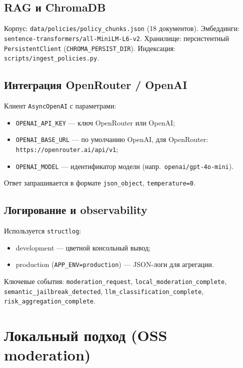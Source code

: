 \documentclass[12pt,a4paper]{report}
\begin{document}
\section{RAG и ChromaDB}

Корпус: \texttt{data/policies/policy\_chunks.json} (18 документов).
Эмбеддинги: \texttt{sentence-transformers/all-MiniLM-L6-v2}.
Хранилище: персистентный \texttt{PersistentClient} (\texttt{CHROMA\_PERSIST\_DIR}).
Индексация: \texttt{scripts/ingest\_policies.py}.

\section{Интеграция OpenRouter / OpenAI}

Клиент \texttt{AsyncOpenAI} с параметрами:
\begin{itemize}
    \item \texttt{OPENAI\_API\_KEY} --- ключ OpenRouter или OpenAI;
    \item \texttt{OPENAI\_BASE\_URL} --- по умолчанию OpenAI, для OpenRouter: \texttt{https://openrouter.ai/api/v1};
    \item \texttt{OPENAI\_MODEL} --- идентификатор модели (напр.\ \texttt{openai/gpt-4o-mini}).
\end{itemize}
Ответ запрашивается в формате \texttt{json\_object}, \texttt{temperature=0}.

\section{Логирование и observability}

Используется \texttt{structlog}:
\begin{itemize}
    \item development --- цветной консольный вывод;
    \item production (\texttt{APP\_ENV=production}) --- JSON-логи для агрегации.
\end{itemize}
Ключевые события: \texttt{moderation\_request}, \texttt{local\_moderation\_complete},
\texttt{semantic\_jailbreak\_detected}, \texttt{llm\_classification\_complete},
\texttt{risk\_aggregation\_complete}.

\chapter{Локальный подход (OSS moderation)}
\end{document}
